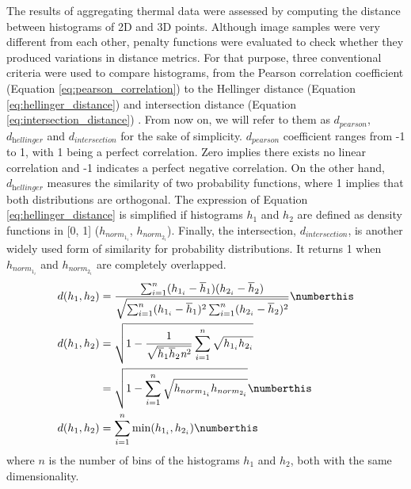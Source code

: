 The results of aggregating thermal data were assessed by computing the distance between histograms of 2D and 3D points. Although image samples were very different from each other, penalty functions were evaluated to check whether they produced variations in distance metrics. For that purpose, three conventional criteria were used to compare histograms, from the Pearson correlation coefficient (Equation \ref{eq:pearson_correlation}) to the Hellinger distance (Equation \ref{eq:hellinger_distance}) and intersection distance (Equation \ref{eq:intersection_distance}) \cite{cha_comprehensive_2007}. From now on, we will refer to them as $d_{\textit{pearson}}$, $d_{\textit{hellinger}}$ and $d_{\textit{intersection}}$ for the sake of simplicity. $d_{\textit{pearson}}$ coefficient ranges from -1 to 1, with 1 being a perfect correlation. Zero implies there exists no linear correlation and -1 indicates a perfect negative correlation. On the other hand, $d_{\textit{hellinger}}$ measures the similarity of two probability functions, where 1 implies that both distributions are orthogonal. The expression of Equation \ref{eq:hellinger_distance} is simplified if histograms $h_1$ and $h_2$ are defined as density functions in [0, 1] ($h_{\textit{norm}_{1_{i}}}$, $h_{\textit{norm}_{2_{i}}}$). Finally, the intersection, $d_{\textit{intersection}}$, is another widely used form of similarity for probability distributions. It returns 1 when $h_{\textit{norm}_{1_{i}}}$ and $h_{\textit{norm}_{2_{i}}}$ are completely overlapped. 
\begin{align*}
    d(h_1, h_2) &= \frac{\sum_{i=1}^{n} (h_{1_{i}} - \overline{h}_{1}) (h_{2_{i}} - \overline{h}_{2})}{\sqrt{\sum_{i=1}^{n} (h_{1_{i}} - \overline{h}_{1})^2 \sum_{i=1}^{n} (h_{2_{i}} - \overline{h}_{2})^2}}
    \numberthis \label{eq:pearson_correlation}\\
    d(h_1, h_2)
    &=\sqrt{1 - \frac{1}{\sqrt{\overline{h}_1 \overline{h}_2 \textit{n}^2}} \sum_{i=1}^{n} \sqrt{h_{1_{i}}h_{2_{i}}}}\\
    &=\sqrt{1 - \sum_{i=1}^{n} \sqrt{h_{norm_{1_{i}}}h_{norm_{2_{i}}}}}
    \numberthis \label{eq:hellinger_distance}\\
    d(h_1, h_2)
    &=\sum_{i=1}^{n} \min(h_{1_{i}}, h_{2_{i}})
    \numberthis \label{eq:intersection_distance}
\end{align*}
where $n$ is the number of bins of the histograms $h_1$ and $h_2$, both with the same dimensionality.

